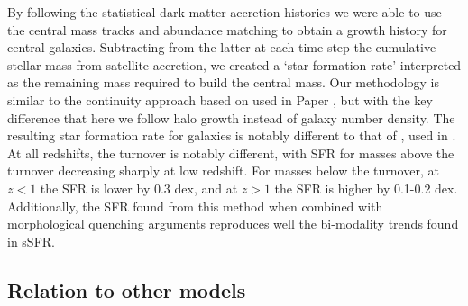 By following the statistical dark matter accretion histories we were able to use the central mass tracks and abundance matching to obtain a growth history for central galaxies. Subtracting from the latter at each time step the cumulative stellar mass from satellite accretion, we created a `star formation rate' interpreted as the remaining mass required to build the central mass. Our methodology is similar to the continuity approach based on \citet{Leja2015ReconcilingFunction} used in Paper , but with the key difference that here we follow halo growth instead of galaxy number density. 
The resulting star formation rate for galaxies is notably different to that of \citet{Tomczak2014GalaxyGalaxies}, used in \citet{Grylls2019PredictingSteel.}. At all redshifts, the turnover is notably different, with SFR for masses above the turnover decreasing sharply at low redshift. For masses below the turnover, at $z < 1$ the SFR is lower by 0.3 dex, and at $z > 1$ the SFR is higher by 0.1-0.2 dex. Additionally, the SFR found from this method when combined with morphological quenching arguments reproduces well the bi-modality trends found in sSFR.

\subsection{Relation to other models}


